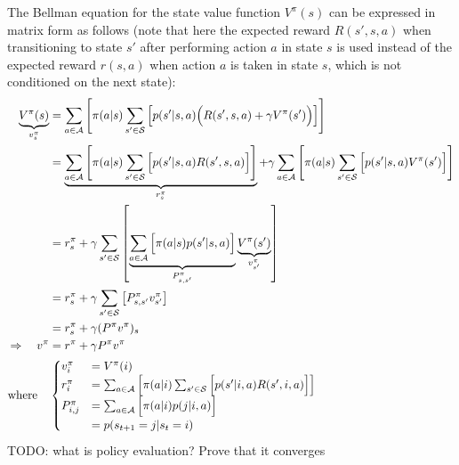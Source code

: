 The Bellman equation for the state value function $V^\pi(s)$ can be expressed in matrix form as follows (note that here the expected reward $R(s',s,a)$ when transitioning to state $s'$ after performing action $a$ in state $s$ is used instead of the expected reward $r(s, a)$ when action $a$ is taken in state $s$, which is not conditioned on the next state):
\begin{align*}
    \underbrace{V^\pi(s)}_{v^\pi_s} &= \sum_{a\in\mathcal{A}}{\left[ \pi(a\vert s) \sum_{s'\in\mathcal{S}}{\left[ p(s'\vert s, a) \Bigl( R(s', s, a) + \gamma V^\pi(s') \Bigr) \right]} \right]} \\
    &= \underbrace{\sum_{a\in\mathcal{A}}{\left[ \pi(a\vert s) \sum_{s'\in\mathcal{S}}{\Bigl[ p(s'\vert s, a) R(s', s, a) \Bigr]} \right]}}_{r^\pi_s} + \gamma\sum_{a\in\mathcal{A}}{\left[ \pi(a\vert s) \sum_{s'\in\mathcal{S}}{\Bigl[ p(s'\vert s, a) V^\pi(s') \Bigr]} \right]} \\
    &= r^\pi_s + \gamma\sum_{s'\in\mathcal{S}}{\left[ \underbrace{\sum_{a\in\mathcal{A}}{\Bigl[ \pi(a\vert s) p(s'\vert s, a) \Bigr]}}_{P^\pi_{s, s'}} \underbrace{V^\pi(s')}_{v^\pi_{s'}} \right]} \\
    &= r^\pi_s + \gamma\sum_{s'\in\mathcal{S}}{\left[ P^\pi_{s, s'} v^\pi_{s'} \right]} \\
    &= r^\pi_s + \gamma  (P^\pi v^\pi)_s \\
    \Rightarrow \quad v^\pi &= r^\pi + \gamma P^\pi v^\pi \\
    \text{where} \quad & \begin{cases}
        v^\pi_i &= V^\pi(i) \\
        r^\pi_i &= \sum_{a\in\mathcal{A}}{\left[ \pi(a\vert i) \sum_{s'\in\mathcal{S}}{\Bigl[ p(s'\vert i, a) R(s', i, a) \Bigr]} \right]} \\
        P^\pi_{i, j} &= \sum_{a\in\mathcal{A}}{\Bigl[ \pi(a\vert i) p(j\vert i, a) \Bigr]} \\
        &= p(s_{t+1}=j\vert s_t=i)
    \end{cases}
\end{align*}
TODO: what is policy evaluation? Prove that it converges
